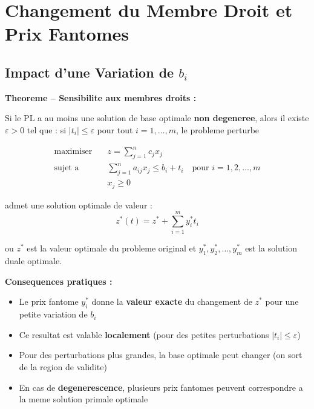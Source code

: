 \documentclass[12pt,a4paper]{article}
\begin{document}
\newpage
\section{Changement du Membre Droit et Prix Fantomes}

\subsection{Impact d'une Variation de $b_i$}

\begin{theoreme}
\textbf{Theoreme -- Sensibilite aux membres droits :}

Si le PL a au moins une solution de base optimale \textcolor{defvert}{\textbf{non degeneree}}, alors il existe $\varepsilon > 0$ tel que : si $|t_i| \leq \varepsilon$ pour tout $i = 1, \ldots, m$, le probleme perturbe

\begin{align*}
\text{maximiser} \quad & z = \sum_{j=1}^{n} c_j x_j\\
\text{sujet a} \quad & \sum_{j=1}^{n} a_{ij} x_j \leq b_i + t_i \quad \text{pour } i = 1, 2, \ldots, m\\
& x_j \geq 0
\end{align*}

admet une solution optimale de valeur :
$$z^*(t) = z^* + \sum_{i=1}^{m} y_i^* t_i$$

ou $z^*$ est la valeur optimale du probleme original et $y_1^*, y_2^*, \ldots, y_m^*$ est la solution duale optimale.
\end{theoreme}

\begin{important}
\textbf{Consequences pratiques :}

\begin{itemize}
    \item Le prix fantome $y_i^*$ donne la \textcolor{importantrouge}{\textbf{valeur exacte}} du changement de $z^*$ pour une petite variation de $b_i$
    \item Ce resultat est valable \textcolor{defvert}{\textbf{localement}} (pour des petites perturbations $|t_i| \leq \varepsilon$)
    \item Pour des perturbations plus grandes, la base optimale peut changer (on sort de la region de validite)
    \item En cas de \textcolor{algoviolet}{\textbf{degenerescence}}, plusieurs prix fantomes peuvent correspondre a la meme solution primale optimale
\end{itemize}
\end{important}
\end{document}
